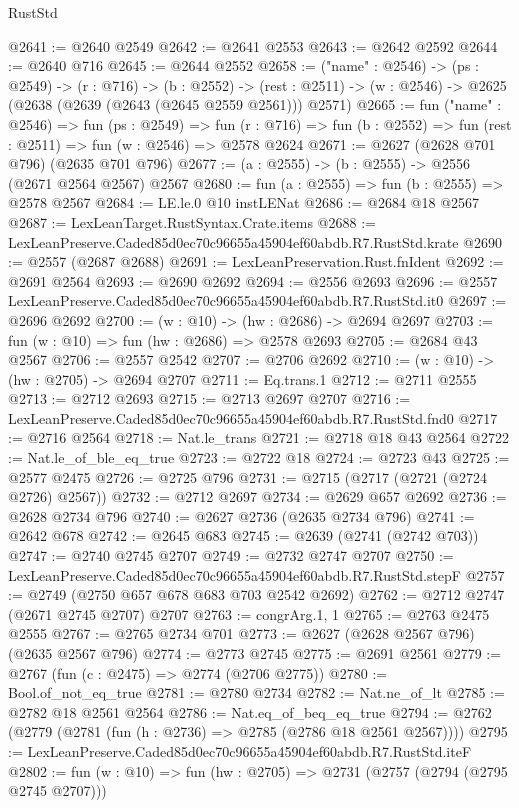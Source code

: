 \begin{lexlean}{RustStd}
\begin{coremodule}
@2641 := @2640 @2549
@2642 := @2641 @2553
@2643 := @2642 @2592
@2644 := @2640 @716
@2645 := @2644 @2552
@2658 := ("name" : @2546) ->
  (ps : @2549) ->
  (r : @716) ->
  (b : @2552) ->
  (rest : @2511) -> (w : @2546) -> @2625 (@2638 (@2639 (@2643 (@2645 @2559 @2561))) @2571)
@2665 := fun ("name" : @2546) =>
  fun (ps : @2549) =>
  fun (r : @716) => fun (b : @2552) => fun (rest : @2511) => fun (w : @2546) => @2578 @2624
@2671 := @2627 (@2628 @701 @796) (@2635 @701 @796)
@2677 := (a : @2555) -> (b : @2555) -> @2556 (@2671 @2564 @2567) @2567
@2680 := fun (a : @2555) => fun (b : @2555) => @2578 @2567
@2684 := LE.le.{0} @10 instLENat
@2686 := @2684 @18 @2567
@2687 := LexLeanTarget.RustSyntax.Crate.items
@2688 := LexLeanPreserve.Caded85d0ec70c96655a45904ef60abdb.R7.RustStd.krate
@2690 := @2557 (@2687 @2688)
@2691 := LexLeanPreservation.Rust.fnIdent
@2692 := @2691 @2564
@2693 := @2690 @2692
@2694 := @2556 @2693
@2696 := @2557 LexLeanPreserve.Caded85d0ec70c96655a45904ef60abdb.R7.RustStd.it0
@2697 := @2696 @2692
@2700 := (w : @10) -> (hw : @2686) -> @2694 @2697
@2703 := fun (w : @10) => fun (hw : @2686) => @2578 @2693
@2705 := @2684 @43 @2567
@2706 := @2557 @2542
@2707 := @2706 @2692
@2710 := (w : @10) -> (hw : @2705) -> @2694 @2707
@2711 := Eq.trans.{1}
@2712 := @2711 @2555
@2713 := @2712 @2693
@2715 := @2713 @2697 @2707
@2716 := LexLeanPreserve.Caded85d0ec70c96655a45904ef60abdb.R7.RustStd.fnd0
@2717 := @2716 @2564
@2718 := Nat.le_trans
@2721 := @2718 @18 @43 @2564
@2722 := Nat.le_of_ble_eq_true
@2723 := @2722 @18
@2724 := @2723 @43
@2725 := @2577 @2475
@2726 := @2725 @796
@2731 := @2715 (@2717 (@2721 (@2724 @2726) @2567))
@2732 := @2712 @2697
@2734 := @2629 @657 @2692
@2736 := @2628 @2734 @796
@2740 := @2627 @2736 (@2635 @2734 @796)
@2741 := @2642 @678
@2742 := @2645 @683
@2745 := @2639 (@2741 (@2742 @703))
@2747 := @2740 @2745 @2707
@2749 := @2732 @2747 @2707
@2750 := LexLeanPreserve.Caded85d0ec70c96655a45904ef60abdb.R7.RustStd.stepF
@2757 := @2749 (@2750 @657 @678 @683 @703 @2542 @2692)
@2762 := @2712 @2747 (@2671 @2745 @2707) @2707
@2763 := congrArg.{1, 1}
@2765 := @2763 @2475 @2555
@2767 := @2765 @2734 @701
@2773 := @2627 (@2628 @2567 @796) (@2635 @2567 @796)
@2774 := @2773 @2745
@2775 := @2691 @2561
@2779 := @2767 (fun (c : @2475) => @2774 (@2706 @2775))
@2780 := Bool.of_not_eq_true
@2781 := @2780 @2734
@2782 := Nat.ne_of_lt
@2785 := @2782 @18 @2561 @2564
@2786 := Nat.eq_of_beq_eq_true
@2794 := @2762 (@2779 (@2781 (fun (h : @2736) => @2785 (@2786 @18 @2561 @2567))))
@2795 := LexLeanPreserve.Caded85d0ec70c96655a45904ef60abdb.R7.RustStd.iteF
@2802 := fun (w : @10) => fun (hw : @2705) => @2731 (@2757 (@2794 (@2795 @2745 @2707)))

\end{coremodule}
\end{lexlean}
